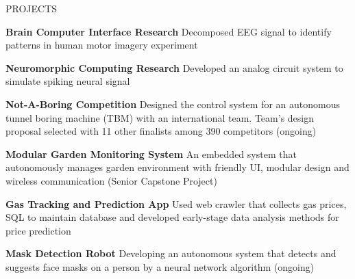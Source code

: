 \documentclass{../lib/resume} %
\begin{document}

\begin{rSection}{PROJECTS}
    \vspace{-1em}
    \item \textbf{Brain Computer Interface Research} {Decomposed EEG signal to identify patterns in human motor imagery experiment}

    \item \textbf{Neuromorphic Computing Research} {Developed an analog circuit system to simulate spiking neural signal}

    \item \textbf{Not-A-Boring Competition} {Designed the control system for an autonomous tunnel boring machine (TBM) with an international team. Team's design proposal selected with 11 other finalists among 390 competitors (ongoing)}

    \item \textbf{Modular Garden Monitoring System} {An embedded system that autonomously manages garden environment with friendly UI, modular design and wireless communication (Senior Capstone Project)}

    \item \textbf{Gas Tracking and Prediction App} {Used web crawler that collects gas prices, SQL to maintain database and developed early-stage data analysis methods for price prediction}

    \item \textbf{Mask Detection Robot} {Developing an autonomous system that detects and suggests face masks on a person by a neural network algorithm (ongoing)}


\end{rSection}
\end{document}
